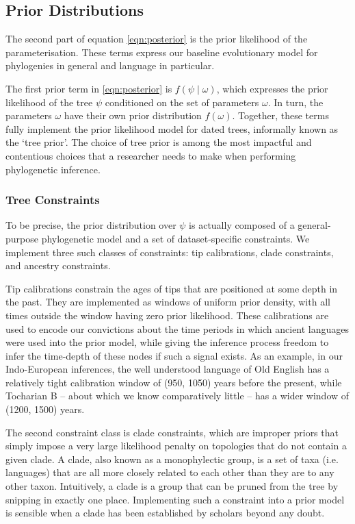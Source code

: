 \documentclass[10pt,journal,compsoc]{IEEEtran}
\begin{document}
\subsection{Prior Distributions}

The second part of equation \eqref{eqn:posterior} is the prior likelihood of the parameterisation. These terms express our baseline evolutionary model for phylogenies in general and language in particular.

The first prior term in \eqref{eqn:posterior} is $f(\psi\;|\;\omega)$, which expresses the prior likelihood of the tree $\psi$ conditioned on the set of parameters $\omega$. In turn, the parameters $\omega$ have their own prior distribution $f(\omega)$. Together, these terms fully implement the prior likelihood model for dated trees, informally known as the `tree prior'. The choice of tree prior is among the most impactful and contentious choices that a researcher needs to make when performing phylogenetic inference.

\subsubsection{Tree Constraints}

To be precise, the prior distribution over $\psi$ is actually composed of a general-purpose phylogenetic model and a set of dataset-specific constraints. We implement three such classes of constraints: tip calibrations, clade constraints, and ancestry constraints.

Tip calibrations constrain the ages of tips that are positioned at some depth in the past. They are implemented as windows of uniform prior density, with all times outside the window having zero prior likelihood. These calibrations are used to encode our convictions about the time periods in which ancient languages were used into the prior model, while giving the inference process freedom to infer the time-depth of these nodes if such a signal exists. As an example, in our Indo-European inferences, the well understood language of Old English has a relatively tight calibration window of (950, 1050) years before the present, while Tocharian B -- about which we know comparatively little -- has a wider window of (1200, 1500) years.

The second constraint class is clade constraints, which are improper priors that simply impose a very large likelihood penalty on topologies that do not contain a given clade. A clade, also known as a monophylectic group, is a set of taxa (i.e. languages) that are all more closely related to each other than they are to any other taxon. Intuitively, a clade is a group that can be pruned from the tree by snipping in exactly one place. Implementing such a constraint into a prior model is sensible when a clade has been established by scholars beyond any doubt.
\end{document}
